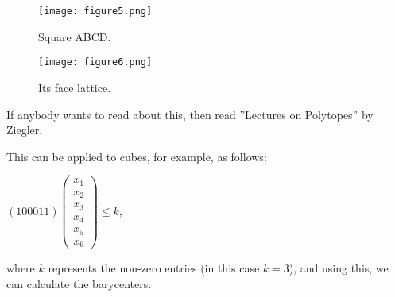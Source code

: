 \begin{figure}
\centering
\texttt{[image: figure5.png]}
\caption{Square ABCD.}
\end{figure}

\begin{figure}
\centering
\texttt{[image: figure6.png]}
\caption{Its face lattice.}
\end{figure}


If anybody wants to read about this, then read ''Lectures on
Polytopes'' by Ziegler.

This can be applied to cubes, for example, as follows:

\begin{center}
  $(1 0 0 0 1 1)\left( \begin{array}{c} x_{1} \\ x_{2} \\ x_{3} \\
      x_{4} \\ x_{5} \\ x_{6} \end{array} \right) \leqslant k$,
\end{center}

where $k$ represents the non-zero entries (in this case $k = 3$), and
using this, we can calculate the barycenters.


 